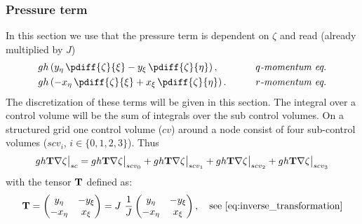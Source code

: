 \subsubsection{Pressure term} \label{sec:linearized_pressure_zeta}
In this section we use that the pressure term is dependent on $\zeta$ and read  (already multiplied by $J$)
\begin{align}
    &g h \left( y_{\eta}\, \pdiff{\zeta}{\xi} - y_{\xi}\, \pdiff{\zeta}{\eta} \right), \qquad &\textit{$q$-momentum eq.}
    \\*
    &g h \left( -x_{\eta}\, \pdiff{\zeta}{\xi} + x_{\xi}\, \pdiff{\zeta}{\eta} \right). \qquad &\textit{$r$-momentum eq.}
\end{align}
The discretization of these terms will be given in this section.
The integral over a control volume will be the sum of integrals over the sub control volumes.
On a structured grid one control volume ($cv$) around a node consist of four sub-control volumes ($scv_i$, $i\in\{0,1,2,3\}$).
Thus
\begin{align}
    gh \mbox{\boldmath ${\mathrm{T}}$} \nabla \zeta\big|_{sc} =
    gh \mbox{\boldmath ${\mathrm{T}}$} \nabla \zeta\big|_{scv_0} +
    gh \mbox{\boldmath ${\mathrm{T}}$} \nabla \zeta\big|_{scv_1} +
    gh \mbox{\boldmath ${\mathrm{T}}$} \nabla \zeta\big|_{scv_2} +
    gh \mbox{\boldmath ${\mathrm{T}}$} \nabla \zeta\big|_{scv_3}
\end{align}
with the tensor $\mbox{\boldmath ${\mathrm{T}}$}$ defined as:
\begin{align}
    \mat{T} =
    \begin{pmatrix}
        y_\eta & -y_\xi \\
        -x_\eta & x_\xi
    \end{pmatrix}
    = J\  \frac{1}{J}\begin{pmatrix}
        y_\eta & -y_\xi \\
        -x_\eta & x_\xi
    \end{pmatrix}, \quad \text{see \autoref{eq:inverse_transformation}}
\end{align}
%
